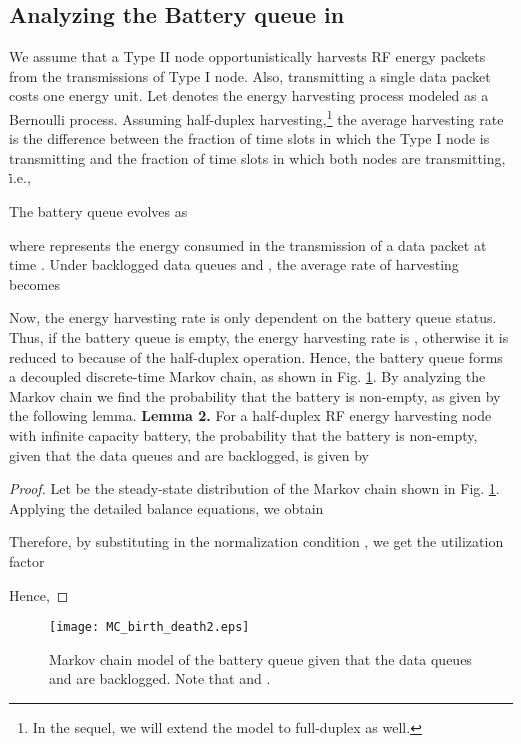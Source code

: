 \documentclass[draftcls,12pt,onecolumn]{IEEEtran}
\begin{document}
\subsection{Analyzing the Battery queue in }
We assume that a Type II node opportunistically harvests RF energy packets from the transmissions of Type I node. Also, transmitting a single data packet costs one energy unit. Let  denotes the energy harvesting process modeled as a Bernoulli process. Assuming half-duplex harvesting,\footnote{In the sequel, we will extend the model to full-duplex as well.} the average harvesting rate is the difference between the fraction of time slots in which the Type I node is transmitting and the fraction of time slots in which both nodes are transmitting, \.i.e.,
\vspace{-0.2in}
 
The battery queue evolves as \cite{jeon2015stability}
\vspace{-0.2in}

where  represents the energy consumed in the transmission of a data packet at time .
Under backlogged data queues  and , the average rate of harvesting becomes 

\indent Now, the energy harvesting rate is only dependent on the battery queue status. Thus, if the battery queue is empty, the energy harvesting rate is , otherwise it is reduced to  because of the half-duplex operation. Hence, the battery queue forms a decoupled discrete-time Markov chain, as shown in Fig. \ref{fig:MC_half_duplex}. By analyzing the Markov chain we find the probability that the battery is non-empty, as given by the following lemma. \newline
\indent \textbf{Lemma 2.} For a half-duplex RF energy harvesting node with infinite capacity battery, the probability that the battery is non-empty, given that the data queues  and  are backlogged, is given by 

\begin{proof}
Let  be the steady-state distribution of the Markov chain shown in Fig. \ref{fig:MC_half_duplex}. Applying the detailed balance equations, we obtain 

Therefore, by substituting in the normalization condition , we get the utilization factor 

Hence,  
\end{proof}


\begin{figure}
\texttt{[image: MC\_birth\_death2.eps]}
\centering
\caption{Markov chain model of the battery queue given that the data queues  and  are backlogged. Note that 
 and .}\label{fig:MC_half_duplex}
\end{figure}
\vspace{-0.2in}
\end{document}
